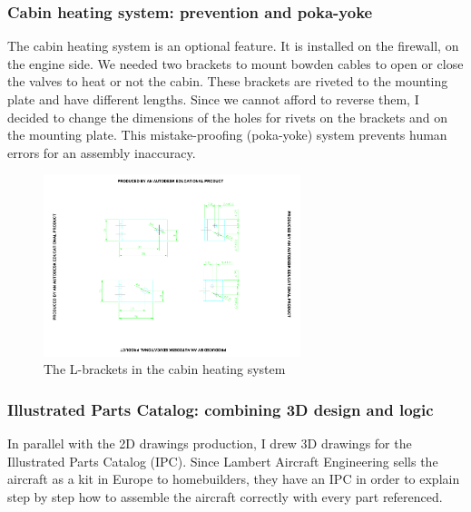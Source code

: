 \documentclass[11pt,a4paper]{article}
\begin{document}
\newpage

\subsubsection{Cabin heating system: prevention and poka-yoke}

The cabin heating system is an optional feature. It is installed on the firewall, on the engine side. We needed two brackets to mount bowden cables to open or close the valves to heat or not the cabin. These brackets are riveted to the mounting plate and have different lengths. Since we cannot afford to reverse them, I decided to change the dimensions of the holes for rivets on the brackets and on the mounting plate. This mistake-proofing (poka-yoke) system prevents human errors for an assembly inaccuracy.

\begin{figure}[ht!]
	\begin{center}
		\includegraphics[width=7.5cm,trim = 6cm 4cm 6cm 3cm, clip]{pics/PIC009.pdf}
		\caption{The L-brackets in the cabin heating system}
		\label{fig:PIC009}
	\end{center}
\end{figure}

\newpage

\subsubsection{Illustrated Parts Catalog: combining 3D design and logic}
\label{subsubsec:IPC}

In parallel with the 2D drawings production, I drew 3D drawings for the Illustrated Parts Catalog (IPC). Since Lambert Aircraft Engineering sells the aircraft as a kit in Europe to homebuilders, they have an IPC in order to explain step by step how to assemble the aircraft correctly with every part referenced.

\bigskip
\end{document}
